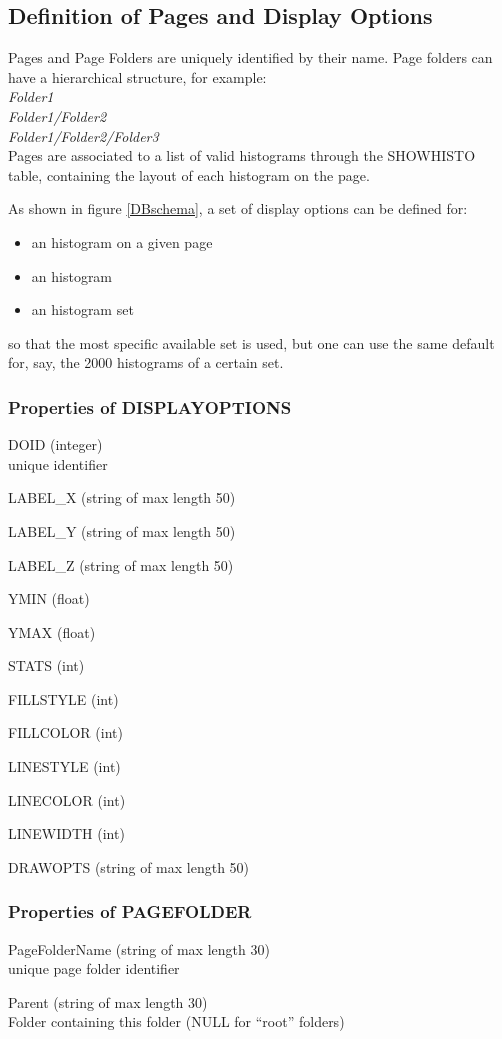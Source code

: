 \documentclass{lhcbnote}
\begin{document}
\subsection{Definition of Pages and Display Options}
Pages and Page Folders are uniquely identified by their name. Page
folders can have a hierarchical structure, for example:\\
{\it Folder1}\\
{\it Folder1/Folder2}\\
{\it Folder1/Folder2/Folder3}\\
Pages are associated to a list of valid histograms through the SHOWHISTO
table, containing the layout of each histogram on the page.

As shown in figure \ref{DBschema}, a set of display options can
be defined for:
\begin{itemize}
\item an histogram on a given page
\item an histogram
\item an histogram set
\end{itemize}
so that the most specific available set is used, but one can use the
same default for, say, the 2000 histograms of a certain set. 

\subsubsection{Properties of DISPLAYOPTIONS}\label{dispopts}
\begin{description}
\item{DOID} (integer)\\
unique identifier 
\item{LABEL\_X}  (string of max length 50)
\item{LABEL\_Y}  (string of max length 50)
\item{LABEL\_Z}  (string of max length 50)
\item{YMIN} (float)
\item{YMAX} (float)
\item{STATS} (int)
\item{FILLSTYLE} (int)
\item{FILLCOLOR} (int)
\item{LINESTYLE} (int)
\item{LINECOLOR} (int)
\item{LINEWIDTH} (int)
\item{DRAWOPTS}  (string of max length 50)
\end{description}
\subsubsection{Properties of PAGEFOLDER}
\begin{description}
\item{PageFolderName} (string of max length 30)\\
unique page folder identifier
\item{Parent} (string of max length 30)\\
Folder containing this folder (NULL for ``root'' folders)
\end{description}
\end{document}
